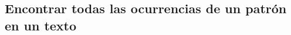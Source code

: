 \inputminted[linenos, frame=lines]{cpp}{problemas/cpp/EPALIN.cpp}
\pagebreak

\inputminted[linenos, frame=lines]{haskell}{problemas/haskell/EPALIN.hs}
\pagebreak

\subsection{Encontrar todas las ocurrencias de un patrón en un texto}


\inputminted[linenos, frame=lines]{cpp}{problemas/cpp/NHAY.cpp}
\pagebreak

\inputminted[linenos, frame=lines]{haskell}{problemas/haskell/NHAY.hs}
\pagebreak


